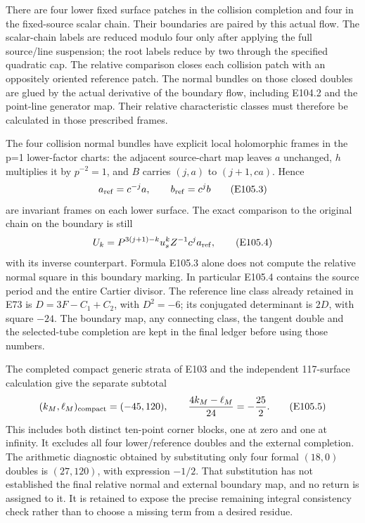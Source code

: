 There are four lower fixed surface patches in the collision completion and four in the fixed-source scalar chain. Their boundaries are paired by this actual flow. The scalar-chain labels are reduced modulo four only after applying the full source/line suspension; the root labels reduce by two through the specified quadratic cap. The relative comparison closes each collision patch with an oppositely oriented reference patch. The normal bundles on those closed doubles are glued by the actual derivative of the boundary flow, including E104.2 and the point-line generator map. Their relative characteristic classes must therefore be calculated in those prescribed frames.

The four collision normal bundles have explicit local holomorphic frames in the p=1 lower-factor charts: the adjacent source-chart map leaves \(a\) unchanged, \(h\) multiplies it by \(p^{-2}=1\), and \(B\) carries \((j,a)\) to \((j+1,ca)\). Hence
\[
                a_{\rm ref}=c^{-j}a,\qquad
                b_{\rm ref}=c^j b
 \tag{E105.3}
\]
are invariant frames on each lower surface. The exact comparison to the original chain on the boundary is still
\[
 U_k=P^{3(j+1)-k}u_s^kZ^{-1}c^j a_{\rm ref},
 \tag{E105.4}
\]
with its inverse counterpart. Formula E105.3 alone does not compute the relative normal square in this boundary marking. In particular E105.4 contains the source period and the entire Cartier divisor. The reference line class already retained in E73 is \(D=3F-C_1+C_2\), with \(D^2=-6\); its conjugated determinant is \(2D\), with square \(-24\). The boundary map, any connecting class, the tangent double and the selected-tube completion are kept in the final ledger before using those numbers.

The completed compact generic strata of E103 and the independent 117-surface calculation give the separate subtotal
\[
 (k_M,\ell_M)_{\rm compact}=(-45,120),
 \qquad \frac{4k_M-\ell_M}{24}=-\frac{25}{2}.
 \tag{E105.5}
\]
This includes both distinct ten-point corner blocks, one at zero and one at infinity. It excludes all four lower/reference doubles and the external completion. The arithmetic diagnostic obtained by substituting only four formal \((18,0)\) doubles is \((27,120)\), with expression \(-1/2\). That substitution has not established the final relative normal and external boundary map, and no return is assigned to it. It is retained to expose the precise remaining integral consistency check rather than to choose a missing term from a desired residue.

\par

